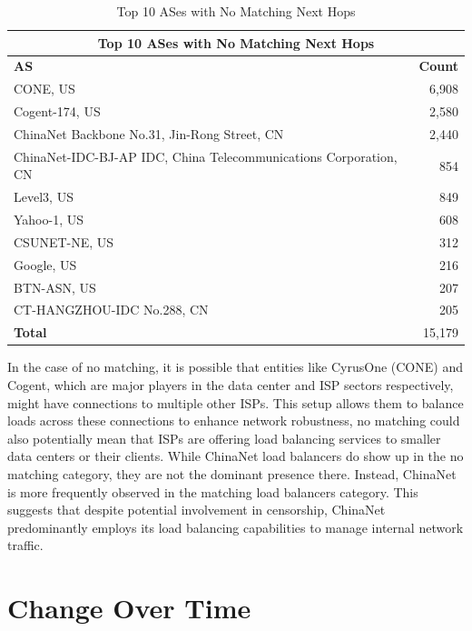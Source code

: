 \documentclass[12pt]{cwru_thesis}
\begin{document}
\begin{table}[h!]
    \centering
    \begin{tabular}{|l|r|}
        \hline
        \multicolumn{2}{|c|}{\textbf{Top 10 ASes with No Matching Next Hops}} \\
        \hline
        \textbf{AS} & \textbf{Count} \\
        \hline
        CONE, US & 6,908 \\
        Cogent-174, US & 2,580 \\
        ChinaNet Backbone No.31, Jin-Rong Street, CN & 2,440 \\
        ChinaNet-IDC-BJ-AP IDC, China Telecommunications Corporation, CN & 854 \\
        Level3, US & 849 \\
        Yahoo-1, US & 608 \\
        CSUNET-NE, US & 312 \\
        Google, US & 216 \\
        BTN-ASN, US & 207 \\
        CT-HANGZHOU-IDC No.288, CN & 205 \\
        \hline
        \textbf{Total} & 15,179 \\
        \hline
    \end{tabular}
    \caption{Top 10 ASes with No Matching Next Hops}
    \label{tab:no_matching}
\end{table}


In the case of no matching, it is possible that entities like CyrusOne (CONE) and Cogent, which are major players in the data center and ISP sectors respectively, might have connections to multiple other ISPs. This setup allows them to balance loads across these connections to enhance network robustness, no matching could also potentially mean that ISPs are offering load balancing services to smaller data centers or their clients.
While ChinaNet load balancers do show up in the no matching category, they are not the dominant presence there. Instead, ChinaNet is more frequently observed in the matching load balancers category. This suggests that despite potential involvement in censorship, ChinaNet predominantly employs its load balancing capabilities to manage internal network traffic.



\section{Change Over Time}
\end{document}
